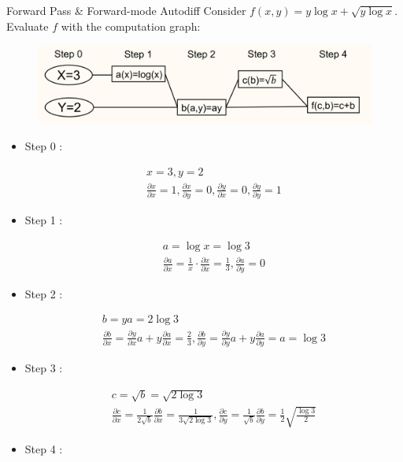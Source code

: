 \begin{frame}[allowframebreaks]

\begin{myexampleblock}{6.42}{Forward Pass & Forward-mode Autodiff}
    Consider $f(x, y)=y \log x+\sqrt{y \log x}$. Evaluate $f$ with the computation graph:

    \begin{figure}[H]
        \centering
        \includegraphics[width=1.0\textwidth]{.././assets/6.11.png}
    \end{figure}

    \begin{itemize}
        \item
        Step 0 :

        $$
        \begin{gathered}
        x=3, y=2 \\
        \frac{\partial x}{\partial x}=1, \frac{\partial x}{\partial y}=0, \frac{\partial y}{\partial x}=0, \frac{\partial y}{\partial y}=1
        \end{gathered}
        $$
        \item
        Step 1 :

        $$
        \begin{gathered}
        a=\log x=\log 3 \\
        \frac{\partial a}{\partial x}=\frac{1}{x} \cdot \frac{\partial x}{\partial x}=\frac{1}{3}, \frac{\partial a}{\partial y}=0
        \end{gathered}
        $$
        \item
        Step 2 :

        $$
        \begin{gathered}
        b=y a=2 \log 3 \\
        \frac{\partial b}{\partial x}=\frac{\partial y}{\partial x} a+y \frac{\partial a}{\partial x}=\frac{2}{3}, \frac{\partial b}{\partial y}=\frac{\partial y}{\partial y} a+y \frac{\partial a}{\partial y}=a=\log 3
        \end{gathered}
        $$
        \item
        Step 3 :

        $$
        \begin{gathered}
        c=\sqrt{b}=\sqrt{2 \log 3} \\
        \frac{\partial c}{\partial x}=\frac{1}{2 \sqrt{b}} \frac{\partial b}{\partial x}=\frac{1}{3 \sqrt{2 \log 3}}, \frac{\partial c}{\partial y}=\frac{1}{\sqrt{b}} \frac{\partial b}{\partial y}=\frac{1}{2} \sqrt{\frac{\log 3}{2}}
        \end{gathered}
        $$
        \item
        Step 4 :


\end{itemize}
\end{myexampleblock}
\end{frame}
